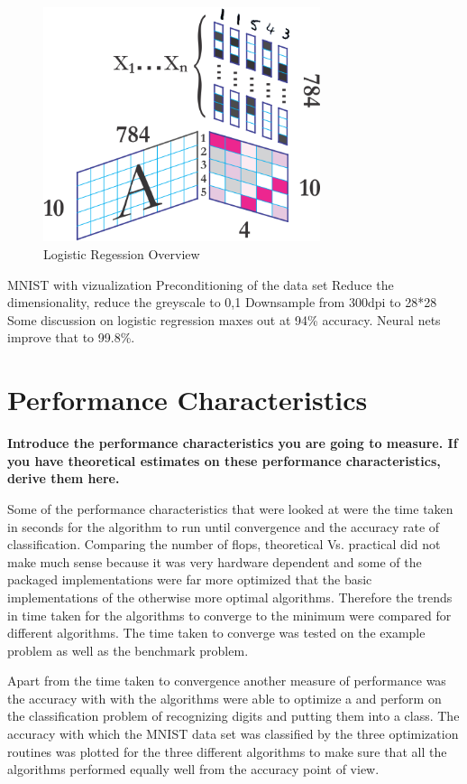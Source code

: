 \documentclass[10pt,twocolumn]{article}
\begin{document}
\begin{figure}
\includegraphics[width=3.2in]{./mnist-logistic.png}
\caption{Logistic Regession Overview}
\end{figure}


MNIST with vizualization
Preconditioning of the data set
Reduce the dimensionality, reduce the greyscale to 0,1
Downsample from 300dpi to 28*28
Some discussion on logistic regression maxes out at 94\% accuracy. Neural nets improve that to 99.8\%. 


\section{Performance Characteristics}

\textbf{Introduce the performance characteristics you are going to measure. If you have theoretical estimates on these performance characteristics, derive them here.}

Some of the performance characteristics that were looked at were the time taken in seconds for the algorithm to run until convergence and the accuracy rate of classification. Comparing the number of flops, theoretical Vs. practical did not make much sense because it was very hardware dependent and some of the packaged implementations were far more optimized that the basic implementations of the otherwise more optimal algorithms. Therefore the trends in time taken for the algorithms to converge to the minimum were compared for different algorithms. The time taken to converge was tested on the example problem as well as the benchmark problem.

Apart from the time taken to convergence another measure of performance was the accuracy with with the algorithms were able to optimize a and perform on the classification problem of recognizing digits and putting them into a class. The accuracy with which the MNIST data set was classified by the three optimization routines was plotted for the three different algorithms to make sure that all the algorithms performed equally well from the accuracy point of view. 
\end{document}

